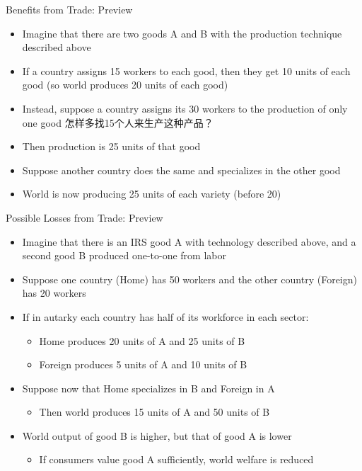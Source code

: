\documentclass[10pt,hyperref={CJKbookmarks=true},xcolor=dvipsnames,aspectratio=169]{beamer}
\begin{document}
\begin{frame}{Benefits from Trade: Preview }

\begin{itemize}
\item Imagine that there are two goods A and B with the production technique
described above 
\item If a country assigns 15 workers to each good, then they get 10 units
of each good (so world produces 20 units of each good) 
\item Instead, suppose a country assigns its 30 workers to the production
of only one good 怎样多找15个人来生产这种产品？
\item Then production is 25 units of that good 
\end{itemize}

\pause{}
\begin{itemize}
\item Suppose another country does the same and specializes in the other
good 
\item World is now producing 25 units of each variety (before 20)
\end{itemize}
\end{frame}

\begin{frame}{Possible Losses from Trade: Preview}

\begin{itemize}
\item Imagine that there is an IRS good A with technology described above,
and a second good B produced one-to-one from labor 
\item Suppose one country (Home) has 50 workers and the other country (Foreign)
has 20 workers 
\item If in autarky each country has half of its workforce in each sector: 

\begin{itemize}
\item Home produces 20 units of A and 25 units of B 
\item Foreign produces 5 units of A and 10 units of B 
\end{itemize}
\item Suppose now that Home specializes in B and Foreign in A 

\begin{itemize}
\item Then world produces 15 units of A and 50 units of B 
\end{itemize}
\item World output of good B is higher, but that of good A is lower 

\begin{itemize}
\item If consumers value good A sufficiently, world welfare is reduced 
\end{itemize}
\end{itemize}
\end{frame}
\end{document}
